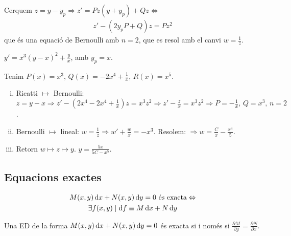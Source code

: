 Cerquem $\boxed{z = y - y_{p}} \Rightarrow z' = Pz (y + y_{p}) + Qz \Leftrightarrow$
\begin{align}
    \boxed{z' - (2y_{p} P + Q)z = Pz^{2}}
\end{align}
que és una equació de Bernoulli amb $n = 2$, que es resol amb el canvi $\displaystyle w = \frac{1}{z}$.
\begin{example}
	$\displaystyle y' = x^{3} (y-x)^{2} + \frac{y}{x}$, amb $y_{p} = x$.

	Tenim $P(x) = x^{3}$, $\displaystyle Q(x) = -2x^{4} + \frac{1}{x}$, $R(x) = x^{5}$.
	\begin{enumerate}[i)]
		\item Ricatti $\mapsto$ Bernoulli:
			\subitem $\displaystyle z = y - x \Rightarrow z' - \left(2x^{4} - 2x^{4} + \frac{1}{x} \right) z  = x^{3} z^{2} \Rightarrow z' - \frac{z}{x} = x^{3} z^{2} \Rightarrow P = - \frac{1}{x}, \, Q = x^{3}, \, n=2$.
		\item Bernoulli $\mapsto$ lineal:
			\subitem $\displaystyle w = \frac{1}{z} \Rightarrow w' + \frac{w}{x} = -x^{3}$.
			\subitem Resolem: $\displaystyle \Rightarrow w = \frac{C}{x} - \frac{x^{4}}{5}$.
		\item Retorn $w \mapsto z \mapsto y$.
			\subitem $\boxed{y = \frac{5x}{5C - x^{5}}}$.
	\end{enumerate}
\end{example}

\subsection{Equacions exactes}
\begin{defi}
	\begin{align}
    \begin{gathered}
		M(x,y) \mathop{}\!\mathrm{d} x + N(x,y) \mathop{}\!\mathrm{d} y = 0 \text{ és exacta} \Leftrightarrow \\
        \exists f(x,y) \mid \mathrm{d} f \equiv M \mathop{}\!\mathrm{d} x + N \mathop{}\!\mathrm{d} y
    \end{gathered}
	\end{align}
\end{defi}
\begin{thm}[d'Euler]
	Una ED de la forma $M(x,y) \mathop{}\!\mathrm{d} x + N(x,y) \mathop{}\!\mathrm{d} y = 0$ és exacta si i només si $\displaystyle \frac{\partial M}{\partial y} = \frac{\partial N}{\partial x}$.
\end{thm}

